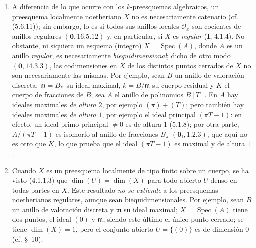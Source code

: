 \begin{remarks}[5.2.5]
\label{IV.2.5.2.5-fr}
\begin{enumerate}
\item[(i)] A diferencia de lo que ocurre con los $k$-preesquemas algebraicos,
un preesquema localmente noetheriano $X$ no es necesariamente catenario
(cf. (5.6.11)); sin embargo, lo es si todos sus anillos locales $\mathcal O_x$
son cocientes de anillos regulares $(\mathbf{0},16.5.12)$ y, en particular, si $X$ es
\emph{regular} (\textbf I, 4.1.4). No obstante, ni siquiera un esquema (íntegro)
$X=\operatorname{Spec}(A)$, donde $A$ es un anillo \emph{regular}, es
necesariamente \emph{biequidimensional}; dicho de otro modo $(\mathbf{0},14.3.3)$,
las codimensiones en $X$ de los distintos puntos cerrados de $X$ no son
necesariamente las mismas. Por ejemplo, sean $B$ un anillo de valoración
discreta, $\mathfrak m=B\pi$ su ideal maximal, $k=B/\mathfrak m$ su cuerpo
residual y $K$ el cuerpo de fracciones de $B$; sea $A$ el anillo de polinomios
$B[T]$. En $A$ hay ideales maximales \emph{de altura} $2$, por ejemplo
$(\pi)+(T)$; pero también hay ideales maximales \emph{de altura} $1$, por
ejemplo el ideal principal $(\pi T-1)$: en efecto, un ideal primo principal
$\ne0$ es de altura $1$ (5.1.8); por otra parte,
$A/(\pi T-1)$ es isomorfo al anillo de fracciones $B_\pi$
$(\mathbf{0}_{\mathrm I},1.2.3)$, que aquí no es otro que $K$, lo que prueba que el
ideal $(\pi T-1)$ es maximal y de altura $1$.

\item[(ii)] Cuando $X$ es un preesquema localmente de tipo finito sobre un
cuerpo, se ha visto (4.1.1.3) que $\dim(U)=\dim(X)$ para todo abierto $U$
denso en todas partes en $X$. Este resultado \emph{no se extiende} a los
preesquemas noetherianos regulares, aunque sean biequidimensionales. Por
ejemplo, sean $B$ un anillo de valoración discreta y $\mathfrak m$ su ideal
maximal; $X=\operatorname{Spec}(A)$ tiene dos puntos, el ideal $(0)$ y
$\mathfrak m$, siendo este último el único punto cerrado; se tiene
$\dim(X)=1$, pero el conjunto abierto $U=\{(0)\}$ es de dimensión $0$
(cf. \S~10).
\end{enumerate}
\end{remarks}
